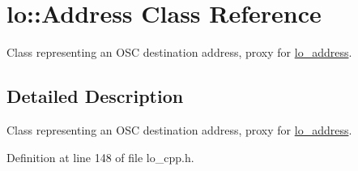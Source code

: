 \hypertarget{classlo_1_1Address}{\section{lo\+:\+:Address Class Reference}
\label{classlo_1_1Address}
}


Class representing an O\+S\+C destination address, proxy for \hyperlink{lo__types_8h_abf9b53223467de596b89e1377b0f3f3d}{lo\+\_\+address}.  




\subsection{Detailed Description}
Class representing an O\+S\+C destination address, proxy for \hyperlink{lo__types_8h_abf9b53223467de596b89e1377b0f3f3d}{lo\+\_\+address}. 

Definition at line 148 of file lo\+\_\+cpp.\+h.

